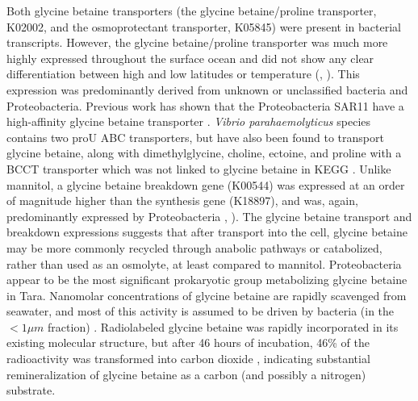 \documentclass[utf8]{frontiersSCNS} %
\begin{document}
Both glycine betaine transporters (the glycine betaine/proline transporter, K02002, and the osmoprotectant transporter, K05845) were present in bacterial transcripts. However, the glycine betaine/proline transporter was much more highly expressed throughout the surface ocean and did not show any clear differentiation between high and low latitudes or temperature (, ). This expression was predominantly derived from unknown or unclassified bacteria and Proteobacteria. Previous work has shown that the Proteobacteria SAR11 have a high-affinity glycine betaine transporter \citep{Noell2019}. \emph{Vibrio parahaemolyticus} species contains two proU ABC transporters, but have also been found to transport glycine betaine, along with dimethylglycine, choline, ectoine, and proline with a BCCT transporter which was not linked to glycine betaine in KEGG \citep{Gregory2020}. Unlike mannitol, a glycine betaine breakdown gene (K00544) was expressed at an order of magnitude higher than the synthesis gene (K18897), and was, again, predominantly expressed by Proteobacteria , ). The glycine betaine transport and breakdown expressions suggests that after transport into the cell, glycine betaine may be more commonly recycled through anabolic pathways or catabolized, rather than used as an osmolyte, at least compared to mannitol. Proteobacteria appear to be the most significant prokaryotic group metabolizing glycine betaine in Tara. Nanomolar concentrations of glycine betaine are rapidly scavenged from seawater, and most of this activity is assumed to be driven by bacteria (in the $<1\mu m$ fraction) \citep{Kiene1998}. Radiolabeled glycine betaine was rapidly incorporated in its existing molecular structure, but after 46 hours of incubation, 46\% of the radioactivity was transformed into carbon dioxide \citep{Kiene1998}, indicating substantial remineralization of glycine betaine as a carbon (and possibly a nitrogen) substrate.
\end{document}
